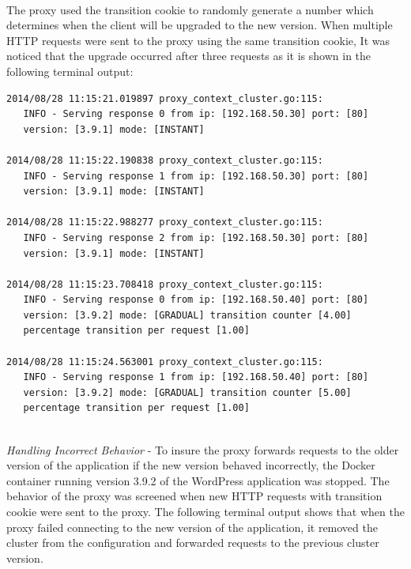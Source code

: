 \documentclass[a4paper,11pt,twoside]{report}
\begin{document}
\noindent\\
The proxy used the transition cookie to randomly generate a number which determines when the client will be upgraded to the new version. When multiple HTTP requests were sent to the proxy using the same transition cookie, It was noticed that the upgrade occurred after three requests as it is shown in the following terminal output: \smallskip

\begin{lstlisting}[language=terminal]
2014/08/28 11:15:21.019897 proxy_context_cluster.go:115:     
   INFO - Serving response 0 from ip: [192.168.50.30] port: [80] 
   version: [3.9.1] mode: [INSTANT]

2014/08/28 11:15:22.190838 proxy_context_cluster.go:115:     
   INFO - Serving response 1 from ip: [192.168.50.30] port: [80] 
   version: [3.9.1] mode: [INSTANT]

2014/08/28 11:15:22.988277 proxy_context_cluster.go:115:     
   INFO - Serving response 2 from ip: [192.168.50.30] port: [80] 
   version: [3.9.1] mode: [INSTANT]

2014/08/28 11:15:23.708418 proxy_context_cluster.go:115:     
   INFO - Serving response 0 from ip: [192.168.50.40] port: [80] 
   version: [3.9.2] mode: [GRADUAL] transition counter [4.00] 
   percentage transition per request [1.00]
   
2014/08/28 11:15:24.563001 proxy_context_cluster.go:115:     
   INFO - Serving response 1 from ip: [192.168.50.40] port: [80] 
   version: [3.9.2] mode: [GRADUAL] transition counter [5.00] 
   percentage transition per request [1.00]
\end{lstlisting}

\noindent\\
\textit{Handling Incorrect Behavior} - To insure the proxy forwards requests to the older version of the application if the new version behaved incorrectly, the Docker container running version 3.9.2 of the WordPress application was stopped. The behavior of the proxy was screened when new HTTP requests with transition cookie were sent to the proxy. The following terminal output shows that when the proxy failed connecting to the new version of the application, it removed the cluster from the configuration and forwarded requests to the previous cluster version. \smallskip
\end{document}
